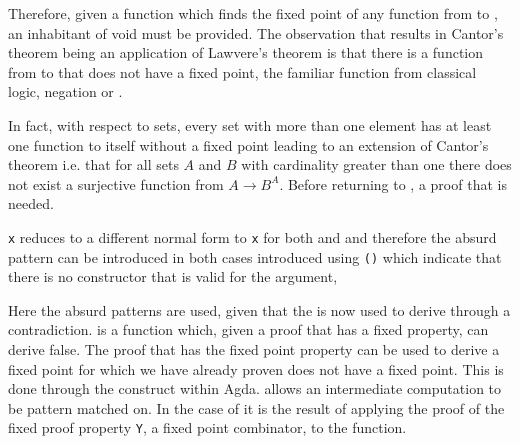 
Therefore, given a function which finds the fixed point of any function from
 to , an inhabitant of void must be
provided. The observation that results in Cantor's theorem being an application
of Lawvere's theorem is that there is a function from  to
 that does not have a fixed point, the familiar function from
classical logic, negation or .


In fact, with respect to sets, every set with more than one element has at least
one function to itself without a fixed point leading to an extension of Cantor's
theorem i.e. that for all sets $A$ and $B$ with cardinality greater than one
there does not exist a surjective function from $A \rightarrow B^A$. Before
returning to , a proof that  is
needed.


 \verb|x| reduces to a different normal form to \verb|x| for
both  and  and therefore the absurd pattern can
be introduced in both cases introduced using \verb|()| which indicate
that there is no constructor that is valid for the argument,


Here the absurd patterns are used,  given that the
 is now used to derive 
through a contradiction.  is a function
which, given a proof that  has a fixed property, can derive
false. The proof that  has the fixed point property can be
used to derive a fixed point for  which we have already proven
does not have a fixed point. This is done through the 
construct within Agda.  allows an intermediate computation to
be pattern matched on. In the case of  it is the
result of applying the proof of the fixed proof property \verb|Y|, a fixed point
combinator, to the  function.


